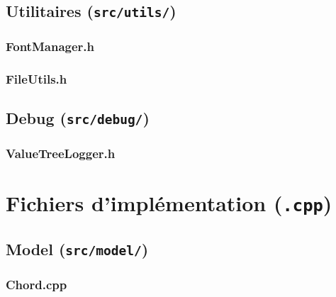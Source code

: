 \newpage
\section{Utilitaires (\texttt{src/utils/})}

\subsection{FontManager.h}


\subsection{FileUtils.h}


\newpage
\section{Debug (\texttt{src/debug/})}

\subsection{ValueTreeLogger.h}



\chapter{Fichiers d'implémentation (\texttt{.cpp})}

\section{Model (\texttt{src/model/})}

\subsection{Chord.cpp}



